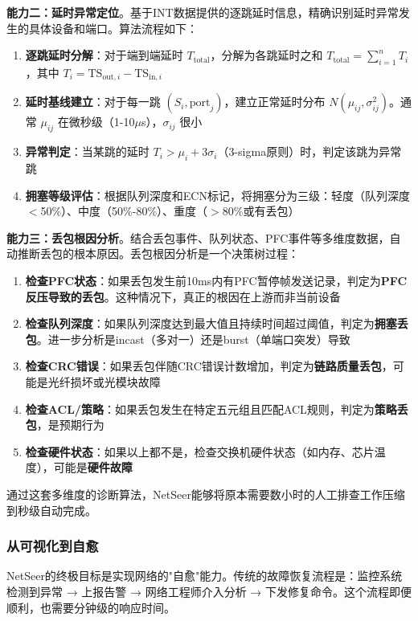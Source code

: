 \textbf{能力二：延时异常定位}。基于INT数据提供的逐跳延时信息，精确识别延时异常发生的具体设备和端口。算法流程如下：
\begin{enumerate}
    \item \textbf{逐跳延时分解}：对于端到端延时 $T_{\text{total}}$，分解为各跳延时之和 $T_{\text{total}} = \sum_{i=1}^{n} T_i$，其中 $T_i = \text{TS}_{\text{out},i} - \text{TS}_{\text{in},i}$
    \item \textbf{延时基线建立}：对于每一跳 $(S_i, \text{port}_j)$，建立正常延时分布 $N(\mu_{ij}, \sigma_{ij}^2)$。通常 $\mu_{ij}$ 在微秒级（1-10$\mu$s），$\sigma_{ij}$ 很小
    \item \textbf{异常判定}：当某跳的延时 $T_i > \mu_i + 3\sigma_i$（3-sigma原则）时，判定该跳为异常跳
    \item \textbf{拥塞等级评估}：根据队列深度和ECN标记，将拥塞分为三级：轻度（队列深度$<$50\%）、中度（50\%-80\%）、重度（$>$80\%或有丢包）
\end{enumerate}

\textbf{能力三：丢包根因分析}。结合丢包事件、队列状态、PFC事件等多维度数据，自动推断丢包的根本原因。丢包根因分析是一个决策树过程：
\begin{enumerate}
    \item \textbf{检查PFC状态}：如果丢包发生前10ms内有PFC暂停帧发送记录，判定为\textbf{PFC反压导致的丢包}。这种情况下，真正的根因在上游而非当前设备
    \item \textbf{检查队列深度}：如果队列深度达到最大值且持续时间超过阈值，判定为\textbf{拥塞丢包}。进一步分析是incast（多对一）还是burst（单端口突发）导致
    \item \textbf{检查CRC错误}：如果丢包伴随CRC错误计数增加，判定为\textbf{链路质量丢包}，可能是光纤损坏或光模块故障
    \item \textbf{检查ACL/策略}：如果丢包发生在特定五元组且匹配ACL规则，判定为\textbf{策略丢包}，是预期行为
    \item \textbf{检查硬件状态}：如果以上都不是，检查交换机硬件状态（如内存、芯片温度），可能是\textbf{硬件故障}
\end{enumerate}

通过这套多维度的诊断算法，NetSeer能够将原本需要数小时的人工排查工作压缩到秒级自动完成。

\subsubsection{从可视化到自愈}

NetSeer的终极目标是实现网络的"自愈"能力。传统的故障恢复流程是：监控系统检测到异常 → 上报告警 → 网络工程师介入分析 → 下发修复命令。这个流程即便顺利，也需要分钟级的响应时间。

